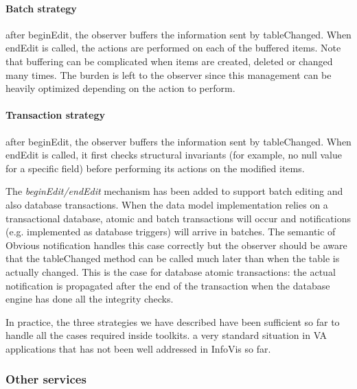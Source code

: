 \paragraph{Batch strategy} after beginEdit, the observer buffers the
  information sent by tableChanged.  When endEdit is called, the
  actions are performed on each of the buffered items.  Note that 
  buffering can be complicated when items are created, deleted or
  changed many times.  The burden is left to the observer since this
  management can be heavily optimized depending on the action to
  perform.

\paragraph{Transaction strategy} after beginEdit, the observer buffers the
  information sent by tableChanged.  When endEdit is called, it first
  checks structural invariants (for example, no null value for a
  specific field) before performing its actions on the modified items.

The \emph{beginEdit/endEdit} mechanism has been added to support batch
editing and also database transactions.  When the data model
implementation relies on a transactional database, atomic and batch
transactions will occur and notifications (e.g. implemented as
database triggers) will arrive in batches.  The semantic of Obvious
notification handles this case correctly but the observer should be
aware that the tableChanged method can be called much later than when
the table is actually changed.  This is the case for database atomic
transactions: the actual notification is propagated after the end of
the transaction when the database engine has done all the integrity
checks.

In practice, the three strategies we have described have been
sufficient so far to handle all the cases required inside toolkits.
 a very standard
situation in VA applications that has not been well addressed in
InfoVis so far.


\subsubsection{Other services}

